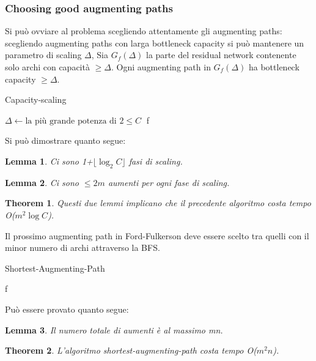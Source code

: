 \documentclass{article}
\newtheorem{theorem}{Theorem}[subsection]
\newtheorem{lemma}{Lemma}[subsection]
\begin{document}
\subsubsection{Choosing good augmenting paths}
Si può ovviare al problema scegliendo attentamente gli augmenting paths: scegliendo augmenting paths con larga bottleneck capacity si può mantenere un parametro di scaling $\Delta$, Sia $G_f(\Delta)$ la parte del residual network contenente solo archi con capacità $\geq \Delta$. Ogni augmenting path in $G_f(\Delta)$ ha bottleneck capacity $\geq\Delta$.
\begin{center}
\begin{algorithm}
\caption{Capacity-scaling}
$\Delta\leftarrow \mbox{la più grande potenza di 2}\leq C\;$
\Return f\;
\end{algorithm}
\end{center}
\newpage
Si può dimostrare quanto segue:
\begin{lemma}
    Ci sono 1+$\lfloor \log_2C\rfloor$ fasi di scaling.
\end{lemma}
\begin{lemma}
    Ci sono $\leq 2m$ aumenti per ogni fase di scaling.
\end{lemma}
\begin{theorem}
    Questi due lemmi implicano che il precedente algoritmo costa tempo O($m^2\log C$).
\end{theorem}
Il prossimo augmenting path in Ford-Fulkerson deve essere scelto tra quelli con il minor numero di archi attraverso la BFS.
\begin{center}
\begin{algorithm}
\caption{Shortest-Augmenting-Path}
\Return f\;
\end{algorithm}
\end{center}
Può essere provato quanto segue:
\begin{lemma}
    Il numero totale di aumenti è al massimo mn.
\end{lemma}
\begin{theorem}
    L'algoritmo shortest-augmenting-path costa tempo O($m^2n$).
\end{theorem}
\newpage
\end{document}
